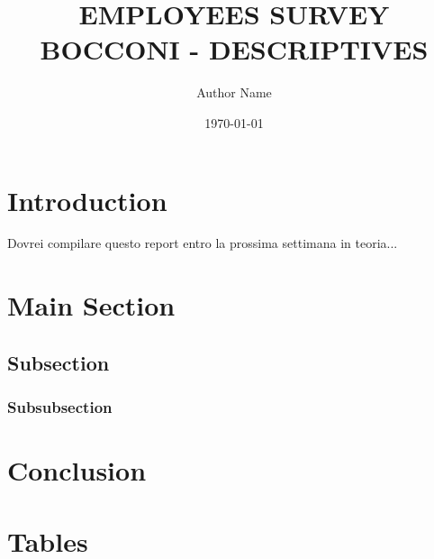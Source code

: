\documentclass[12pt]{article}
\title{EMPLOYEES SURVEY BOCCONI - DESCRIPTIVES}
\author{Author Name}
\date{\today}
\numberwithin{figure}{section}
\numberwithin{table}{section}
\begin{document}
\maketitle


\section{Introduction}
Dovrei compilare questo report entro la prossima settimana in teoria...

\section{Main Section}



\subsection{Subsection}
\blindtext

\subsubsection{Subsubsection}
\blindtext

\section{Conclusion}
\blindtext

\newpage
\section*{Tables}














\end{document}
